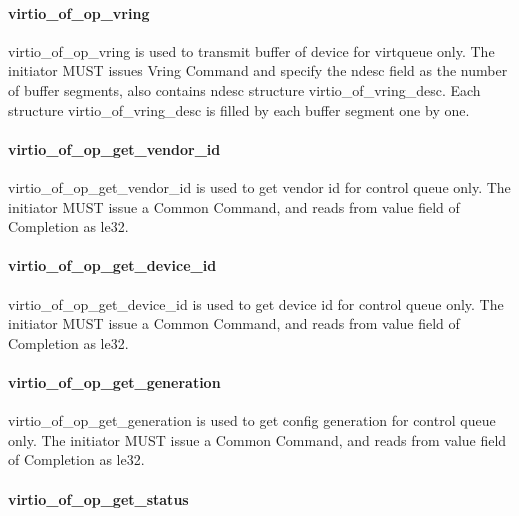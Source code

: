 \paragraph{virtio_of_op_vring}\label{sec:Virtio Transport Options / Virtio Over Fabrics / Transmition Protocol / Opcodes Definition / virtio_of_op_vring}

virtio_of_op_vring is used to transmit buffer of device for virtqueue only. The initiator MUST issues Vring Command and specify the ndesc field as the number of buffer segments, also contains ndesc structure virtio_of_vring_desc. Each structure virtio_of_vring_desc is filled by each buffer segment one by one.

\paragraph{virtio_of_op_get_vendor_id}\label{sec:Virtio Transport Options / Virtio Over Fabrics / Transmition Protocol / Opcodes Definition / virtio_of_op_get_vendor_id}

virtio_of_op_get_vendor_id is used to get vendor id for control queue only. The initiator MUST issue a Common Command, and reads from value field of Completion as le32.

\paragraph{virtio_of_op_get_device_id}\label{sec:Virtio Transport Options / Virtio Over Fabrics / Transmition Protocol / Opcodes Definition / virtio_of_op_get_device_id}

virtio_of_op_get_device_id is used to get device id for control queue only. The initiator MUST issue a Common Command, and reads from value field of Completion as le32.

\paragraph{virtio_of_op_get_generation}\label{sec:Virtio Transport Options / Virtio Over Fabrics / Transmition Protocol / Opcodes Definition / virtio_of_op_get_generation}

virtio_of_op_get_generation is used to get config generation for control queue only. The initiator MUST issue a Common Command, and reads from value field of Completion as le32.

\paragraph{virtio_of_op_get_status}\label{sec:Virtio Transport Options / Virtio Over Fabrics / Transmition Protocol / Opcodes Definition / virtio_of_op_get_status}

